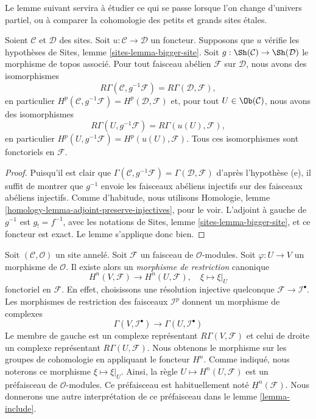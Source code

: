 \noindent
Le lemme suivant servira à étudier ce qui se passe lorsque l'on change
d'univers partiel, ou à comparer la cohomologie des petits et grands sites
\'etales.

\begin{lemma}
\label{lemma-cohomology-bigger-site}
Soient $\mathcal{C}$ et $\mathcal{D}$ des sites.
Soit $u : \mathcal{C} \to \mathcal{D}$ un foncteur.
Supposons que $u$ vérifie les hypothèses de
Sites, lemme \ref{sites-lemma-bigger-site}.
Soit $g : \Sh(\mathcal{C}) \to \Sh(\mathcal{D})$
le morphisme de topos associé.
Pour tout faisceau abélien $\mathcal{F}$ sur $\mathcal{D}$, nous avons des
isomorphismes
$$
R\Gamma(\mathcal{C}, g^{-1}\mathcal{F}) = R\Gamma(\mathcal{D}, \mathcal{F}),
$$
en particulier
$H^p(\mathcal{C}, g^{-1}\mathcal{F}) = H^p(\mathcal{D}, \mathcal{F})$
et, pour tout $U \in \Ob(\mathcal{C})$, nous avons des isomorphismes
$$
R\Gamma(U, g^{-1}\mathcal{F}) = R\Gamma(u(U), \mathcal{F}),
$$
en particulier
$H^p(U, g^{-1}\mathcal{F}) = H^p(u(U), \mathcal{F})$. Tous ces
isomorphismes sont fonctoriels en $\mathcal{F}$.
\end{lemma}

\begin{proof}
Puisqu'il est clair que
$\Gamma(\mathcal{C}, g^{-1}\mathcal{F}) = \Gamma(\mathcal{D}, \mathcal{F})$
d'après l'hypothèse (e), il suffit de montrer que $g^{-1}$ envoie les faisceaux
abéliens injectifs sur des faisceaux abéliens injectifs. Comme d'habitude, nous utilisons
Homologie, lemme \ref{homology-lemma-adjoint-preserve-injectives},
pour le voir. L'adjoint à gauche de $g^{-1}$ est $g_! = f^{-1}$, avec les
notations de
Sites, lemme \ref{sites-lemma-bigger-site},
et ce foncteur est exact. Le lemme s'applique donc bien.
\end{proof}

\noindent
Soit $(\mathcal{C}, \mathcal{O})$ un site annelé.
Soit $\mathcal{F}$ un faisceau de $\mathcal{O}$-modules.
Soit $\varphi : U \to V$ un morphisme de $\mathcal{O}$.
Il existe alors un {\it morphisme de restriction} canonique
\begin{equation}
\label{equation-restriction-mapping}
H^n(V, \mathcal{F})
\longrightarrow
H^n(U, \mathcal{F}), \quad
\xi \longmapsto \xi|_U
\end{equation}
fonctoriel en $\mathcal{F}$. En effet, choisissons une résolution
injective quelconque $\mathcal{F} \to \mathcal{I}^\bullet$. Les morphismes de
restriction des faisceaux $\mathcal{I}^p$ donnent un morphisme de complexes
$$
\Gamma(V, \mathcal{I}^\bullet)
\longrightarrow
\Gamma(U, \mathcal{I}^\bullet)
$$
Le membre de gauche est un complexe représentant $R\Gamma(V, \mathcal{F})$
et celui de droite un complexe représentant $R\Gamma(U, \mathcal{F})$.
Nous obtenons le morphisme sur les groupes de cohomologie en appliquant le foncteur $H^n$.
Comme indiqué, nous noterons ce morphisme $\xi \mapsto \xi|_U$.
Ainsi, la règle $U \mapsto H^n(U, \mathcal{F})$ est un préfaisceau de
$\mathcal{O}$-modules. Ce préfaisceau est habituellement noté
$\underline{H}^n(\mathcal{F})$. Nous donnerons une autre interprétation
de ce préfaisceau dans le lemme \ref{lemma-include}.

